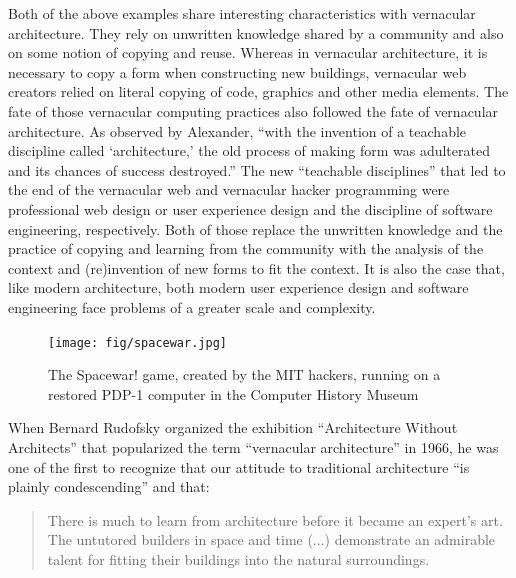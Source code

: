Both of the above examples share interesting characteristics with vernacular architecture.
They rely on unwritten knowledge shared by a community and also on some notion of copying
and reuse. Whereas in vernacular architecture, it is necessary to copy a form when constructing
new buildings, vernacular web creators relied on literal copying of code, graphics and other
media elements. The fate of those vernacular computing practices also followed the fate of
vernacular architecture. As observed by Alexander, ``with the invention of a teachable discipline
called `architecture,'  the old process of making form was adulterated and its chances of success
destroyed.'' The new ``teachable disciplines'' that led to the end of the
vernacular web and vernacular hacker programming were professional web design or user experience
design and the discipline of software engineering, respectively. Both of those replace the
unwritten knowledge and the practice of copying and learning from the community with the
analysis of the context and (re)invention of new forms to fit the context. It is also the case that,
like modern architecture, both modern user experience design and software engineering face problems
of a greater scale and complexity.

\begin{figure}
  \centering
  \texttt{[image: fig/spacewar.jpg]}
  \caption{The Spacewar! game, created by the MIT hackers, running on a restored PDP-1 computer
  in the Computer History Museum}
  \label{fig:spacewar}
\end{figure}


When Bernard Rudofsky organized the exhibition ``Architecture Without Architects'' that popularized
the term ``vernacular architecture'' in 1966, he was one of the first to recognize that our
attitude to traditional architecture ``is plainly condescending'' and that:

\begin{quote}
There is much to learn from architecture before it became an expert's art. The
untutored builders in space and time (...) demonstrate an admirable talent for
fitting their buildings into the natural surroundings.
\end{quote}

